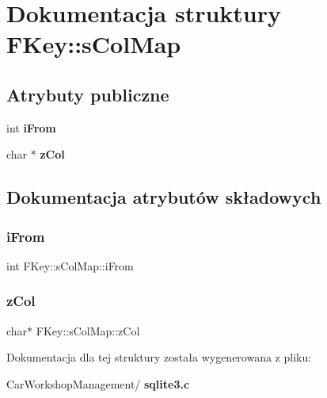 \section{Dokumentacja struktury F\+Key\+::s\+Col\+Map}
\label{struct_f_key_1_1s_col_map}
\subsection*{Atrybuty publiczne}
\begin{DoxyCompactItemize}
\item 
int \textbf{ i\+From}
\item 
char $\ast$ \textbf{ z\+Col}
\end{DoxyCompactItemize}


\subsection{Dokumentacja atrybutów składowych}
\mbox{\label{struct_f_key_1_1s_col_map_a2b0ed19d4924a93d1f3f14f891b176ed}} 
\subsubsection{iFrom}
{\footnotesize\ttfamily int F\+Key\+::s\+Col\+Map\+::i\+From}

\mbox{\label{struct_f_key_1_1s_col_map_a4cdef475be73cc460873051a2c2c2937}} 
\subsubsection{zCol}
{\footnotesize\ttfamily char$\ast$ F\+Key\+::s\+Col\+Map\+::z\+Col}



Dokumentacja dla tej struktury została wygenerowana z pliku\+:\begin{DoxyCompactItemize}
\item 
Car\+Workshop\+Management/\textbf{ sqlite3.\+c}\end{DoxyCompactItemize}

